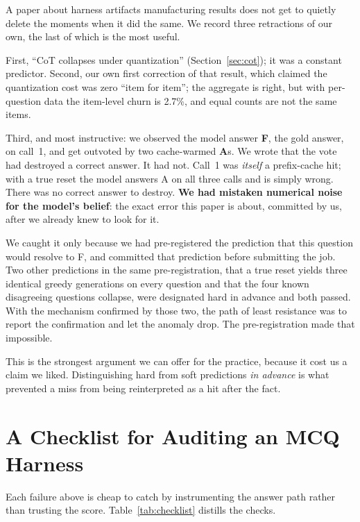 \documentclass{article}
\begin{document}
A paper about harness artifacts manufacturing results does not get to quietly delete the moments when it did the same. We record three retractions of our own, the last of which is the most useful.

First, ``CoT collapses under quantization'' (Section~\ref{sec:cot}); it was a constant predictor. Second, our own first correction of that result, which claimed the quantization cost was zero ``item for item''; the aggregate is right, but with per-question data the item-level churn is 2.7\%, and equal counts are not the same items.

Third, and most instructive: we observed the model answer \textbf{F}, the gold answer, on call~1, and get outvoted by two cache-warmed \textbf{A}s. We wrote that the vote had destroyed a correct answer. It had not. Call~1 was \emph{itself} a prefix-cache hit; with a true reset the model answers A on all three calls and is simply wrong. There was no correct answer to destroy. \textbf{We had mistaken numerical noise for the model's belief}: the exact error this paper is about, committed by us, after we already knew to look for it.

We caught it only because we had pre-registered the prediction that this question would resolve to F, and committed that prediction before submitting the job. Two other predictions in the same pre-registration, that a true reset yields three identical greedy generations on every question and that the four known disagreeing questions collapse, were designated hard in advance and both passed. With the mechanism confirmed by those two, the path of least resistance was to report the confirmation and let the anomaly drop. The pre-registration made that impossible.

This is the strongest argument we can offer for the practice, because it cost us a claim we liked. Distinguishing hard from soft predictions \emph{in advance} is what prevented a miss from being reinterpreted as a hit after the fact.

\section{A Checklist for Auditing an MCQ Harness}

Each failure above is cheap to catch by instrumenting the answer path rather than trusting the score. Table~\ref{tab:checklist} distills the checks.
\end{document}

